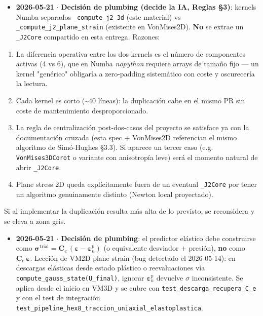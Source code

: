 \documentclass[11pt,letterpaper,oneside]{report}
\begin{document}
\begin{itemize}
  \item \textbf{2026-05-21} \ensuremath{\cdot} \textbf{Decisión de plumbing (decide la IA, Reglas §3)}: kernels Numba separados \texttt{\_compute\_j2\_3d} (este material) vs \texttt{\_compute\_j2\_plane\_strain} (existente en VonMises2D). \textbf{No} se extrae un \texttt{\_J2Core} compartido en esta entrega. Razones:
\end{itemize}
\begin{enumerate}
  \item La diferencia operativa entre los dos kernels es el número de componentes activas (4 vs 6), que en Numba \textit{nopython} requiere arrays de tamaño fijo --- un kernel "genérico" obligaría a zero-padding sistemático con coste y oscurecería la lectura.
  \item Cada kernel es corto (\textasciitilde{}40 líneas): la duplicación cabe en el mismo PR sin coste de mantenimiento desproporcionado.
  \item La regla de centralización post-dos-casos del proyecto se satisface ya con la documentación cruzada (esta spec + VonMises2D referencian el mismo algoritmo de Simó-Hughes §3.3). Si aparece un tercer caso (e.g. \texttt{VonMises3DCorot} o variante con anisotropía leve) será el momento natural de abrir \texttt{\_J2Core}.
  \item Plane stress 2D queda explícitamente fuera de un eventual \texttt{\_J2Core} por tener un algoritmo genuinamente distinto (Newton local proyectado).
\end{enumerate}

  Si al implementar la duplicación resulta más alta de lo previsto, se reconsidera y se eleva a zona gris.

\begin{itemize}
  \item \textbf{2026-05-21} \ensuremath{\cdot} \textbf{Decisión de plumbing}: el predictor elástico debe construirse como $\boldsymbol\sigma^\text{trial} = \mathbf C_e\,(\boldsymbol\varepsilon - \boldsymbol\varepsilon^p_n)$ (o equivalente desviador + presión), \textbf{no} como $\mathbf C_e\,\boldsymbol\varepsilon$. Lección de VM2D plane strain (bug detectado el 2026-05-14): en descargas elásticas desde estado plástico o reevaluaciones vía \texttt{compute\_gauss\_state(U\_final)}, ignorar $\boldsymbol\varepsilon^p_n$ devuelve \ensuremath{\sigma} inconsistente. Se aplica desde el inicio en VM3D y se cubre con \texttt{test\_descarga\_recupera\_C\_e} y con el test de integración \texttt{test\_pipeline\_hex8\_traccion\_uniaxial\_elastoplastica}.
\end{itemize}
\end{document}

